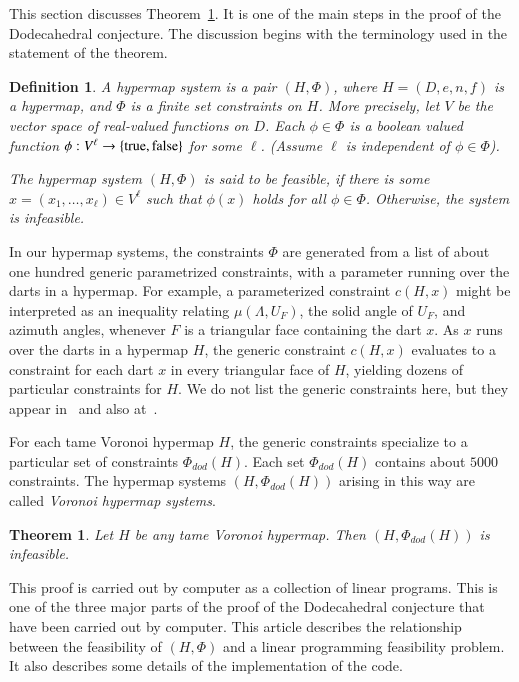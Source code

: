 \documentclass{article} %
\newtheorem{theorem}{Theorem}[section]
\newtheorem{definition}[lemma]{Definition}
\begin{document}
This section discusses Theorem~\ref{thm:graph-system}.  It is one of
the main steps in the proof of the Dodecahedral conjecture.
The discussion begins with the terminology used in the
statement of the theorem.


\begin{definition} A hypermap system is a pair $(H,\Phi)$,
where $H=(D,e,n,f)$ is a hypermap, and $\Phi$ is a finite set constraints on $H$.  More precisely, let $V$ be the vector space of
real-valued functions on $D$.  Each $\phi\in\Phi$ is a boolean valued function 
$\phi:V^\ell\to \{{\operatorname{true}},{\operatorname{false}}\}$
for some $\ell$. (Assume $\ell$ is independent of $\phi\in \Phi$).

The hypermap system $(H,\Phi)$ is said to be feasible, if
there is some $x=(x_1,\ldots,x_\ell)\in V^\ell$ such that
$\phi(x)$ holds for all $\phi\in\Phi$. Otherwise,  
the system is infeasible.
\end{definition}

%
In our hypermap systems, the constraints $\Phi$ 
are generated from a list of
about one hundred generic parametrized constraints, with a parameter
running over the darts in a hypermap. 
For example, a parameterized constraint $c(H,x)$ might be 
interpreted as an inequality
relating  $\mu(\Lambda,U_F)$, 
the solid angle of $U_F$, and
azimuth angles, whenever $F$ is a triangular  face containing the dart $x$.
As $x$ runs over the darts in a hypermap $H$, 
the generic constraint $c(H,x)$ 
evaluates to a constraint for each dart $x$ in every triangular face of $H$, 
yielding dozens of particular constraints for $H$.
  We do not list the generic constraints here, but they appear
in~\cite{Hales:2002:Dodec} and also
at~\cite{McLaughlin:2008:KeplerCode}.

For each tame Voronoi hypermap $H$, the generic constraints specialize
to a particular set of constraints $\Phi_{dod}(H)$. Each set $\Phi_{dod}(H)$
contains about $5000$ constraints. The hypermap
systems $(H, \Phi_{dod}(H))$ arising in this way are called 
\emph{Voronoi hypermap systems}.


\begin{theorem}\label{thm:graph-system}  Let 
$H$ be any tame Voronoi hypermap. 
Then $(H,\Phi_{dod}(H))$ is infeasible.
\end{theorem}

This proof is carried out by computer as a collection of linear
programs. This is one of the three major parts of the proof of the
Dodecahedral conjecture that have been carried out by computer. This
article describes the relationship between the feasibility of
$(H,\Phi)$ and a linear programming feasibility problem. It also
describes some details of the implementation of the code.
\end{document}
